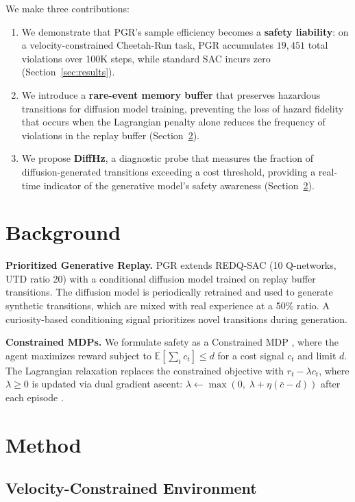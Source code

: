 \documentclass[11pt]{article}
\begin{document}
We make three contributions:
\begin{enumerate}
    \item We demonstrate that PGR's sample efficiency becomes a \textbf{safety liability}: on a velocity-constrained Cheetah-Run task, PGR accumulates $19{,}451$ total violations over 100K steps, while standard SAC incurs zero (Section~\ref{sec:results}).
    \item We introduce a \textbf{rare-event memory buffer} that preserves hazardous transitions for diffusion model training, preventing the loss of hazard fidelity that occurs when the Lagrangian penalty alone reduces the frequency of violations in the replay buffer (Section~\ref{sec:method}).
    \item We propose \textbf{DiffHz}, a diagnostic probe that measures the fraction of diffusion-generated transitions exceeding a cost threshold, providing a real-time indicator of the generative model's safety awareness (Section~\ref{sec:method}).
\end{enumerate}

\section{Background}

\textbf{Prioritized Generative Replay.}
PGR \citep{wang2025pgr} extends REDQ-SAC \citep{chen2021redq} (10 Q-networks, UTD ratio 20) with a conditional diffusion model trained on replay buffer transitions.
The diffusion model is periodically retrained and used to generate synthetic transitions, which are mixed with real experience at a 50\% ratio.
A curiosity-based conditioning signal prioritizes novel transitions during generation.

\textbf{Constrained MDPs.}
We formulate safety as a Constrained MDP \citep{altman1999cmdp}, where the agent maximizes reward subject to $\mathbb{E}[\sum_t c_t] \leq d$ for a cost signal $c_t$ and limit $d$.
The Lagrangian relaxation replaces the constrained objective with $r_t - \lambda c_t$, where $\lambda \geq 0$ is updated via dual gradient ascent: $\lambda \leftarrow \max(0,\; \lambda + \eta(\bar{c} - d))$ after each episode \citep{tessler2018reward}.

\section{Method}
\label{sec:method}

\subsection{Velocity-Constrained Environment}
\end{document}

